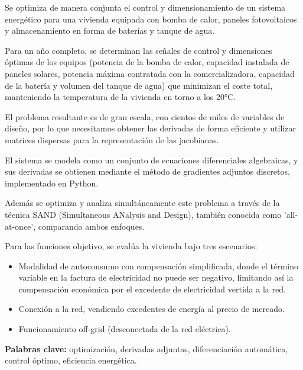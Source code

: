 Se optimiza de manera conjunta el control y dimensionamiento de un sistema
energético para una vivienda equipada con bomba de calor, paneles fotovoltaicos
y almacenamiento en forma de baterías y tanque de agua.

Para un año completo, se determinan las señales de control y dimensiones
óptimas de los equipos (potencia de la bomba de calor, capacidad instalada de
paneles solares, potencia máxima contratada con la comercializadora, capacidad
de la batería y volumen del tanque de agua) que minimizan el coste total,
manteniendo la temperatura de la vivienda en torno a los 20°C.

El problema resultante es de gran escala, con cientos de miles de variables de
diseño, por lo que necesitamos obtener las derivadas de forma eficiente y
utilizar matrices dispersas para la representación de las jacobianas.

El sistema se modela como un conjunto de ecuaciones diferenciales algebraicas,
y sus derivadas se obtienen mediante el método de gradientes adjuntos
discretos, implementado en Python.

Además se optimiza y analiza simultáneamente este problema a través de la
técnica SAND (Simultaneous ANalysis and Design), también conocida como
'all-at-once', comparando ambos enfoques.

Para las funciones objetivo, se evalúa la vivienda bajo tres escenarios:

\begin{itemize}
	\item Modalidad de autoconsumo con compensación simplificada, donde el término
	      variable en la factura de electricidad no puede ser negativo, limitando así la
	      compensación económica por el excedente de electricidad vertida a la red.
	\item Conexión a la red, vendiendo excedentes de energía al precio de mercado.
	\item Funcionamiento off-grid (desconectada de la red eléctrica).
\end{itemize}
\begin{flushleft}
	\textbf{Palabras clave:} optimización, derivadas adjuntas, diferenciación
	automática, control óptimo, eficiencia energética.
\end{flushleft}
